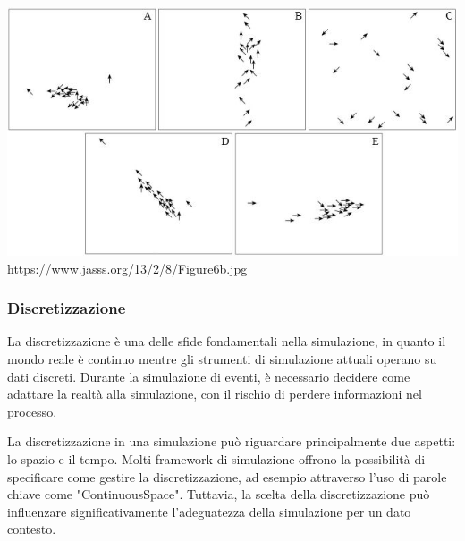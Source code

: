 \begin{minipage}{\linewidth}
    \centering
    \includegraphics{img/Figure6b.jpg}
    \url{https://www.jasss.org/13/2/8/Figure6b.jpg}
    \label{fig:flock_emergent_behaviour}
\end{minipage}

\subsubsection{Discretizzazione}

La discretizzazione è una delle sfide fondamentali nella simulazione, 
in quanto il mondo reale è continuo mentre gli strumenti di simulazione 
attuali operano su dati discreti. Durante la simulazione di eventi, 
è necessario decidere come adattare la realtà alla simulazione, 
con il rischio di perdere informazioni nel processo.

La discretizzazione in una simulazione può riguardare principalmente 
due aspetti: lo spazio e il tempo. Molti framework di simulazione offrono 
la possibilità di specificare come gestire la discretizzazione, 
ad esempio attraverso l'uso di parole chiave come "ContinuousSpace". 
Tuttavia, la scelta della discretizzazione può influenzare 
significativamente l'adeguatezza della simulazione per un dato contesto.

